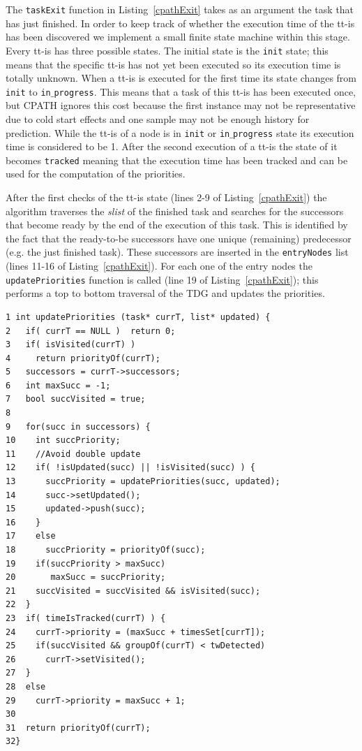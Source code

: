 The \texttt{taskExit} function in Listing~\ref{cpathExit} takes as an argument the task that has just finished. 
In order to keep track of whether the execution time of the tt-is has been discovered we implement a small finite state machine within this stage.
Every tt-is has three possible states. 
The initial state is the \texttt{init} state; this means that the specific tt-is has not yet been executed so its execution time is totally unknown.
When a tt-is is executed for the first time its state changes from \texttt{init} to 
\texttt{in$\_$progress}. 
This means that a task of this tt-is has been executed once, but CPATH ignores this cost because the first instance may not be representative due to cold start effects and one sample may not be enough history for prediction.
While the tt-is of a node is in \texttt{init} or \texttt{in$\_$progress} state its execution time is considered to be 1.
After the second execution of a tt-is the state of it becomes \texttt{tracked} meaning that the execution time has been tracked and can be used for the computation of the priorities.

After the first checks of the tt-is state (lines 2-9 of Listing~\ref{cpathExit}) the algorithm traverses the \textit{slist} of the finished task and searches for the successors that become ready by the end of the execution of this task.
This is identified by the fact that the ready-to-be successors have one unique (remaining) predecessor (e.g. the just finished task).
These successors are inserted in the \texttt{entryNodes} list (lines 11-16 of Listing~\ref{cpathExit}).
For each one of the entry nodes the \texttt{updatePriorities} function is called (line 19 of Listing~\ref{cpathExit}); this performs a top to bottom traversal of the TDG and updates the priorities.

\begin{lstlisting}[float, emph={for,in,void,if,return,non_critical_queue, critical_queue,submit_task}, captionpos=b, caption={Pseudo-code for task prioritization with CPATH},label=cpathUpdate, emph={[2]mat}, emphstyle={[2]}, aboveskip={0\baselineskip}, frame=tb, belowskip={-0.5cm}]
1 int updatePriorities (task* currT, list* updated) {
2   if( currT == NULL )  return 0;
3   if( isVisited(currT) )  
4     return priorityOf(currT);
5   successors = currT->successors;
6   int maxSucc = -1;
7   bool succVisited = true;
8  
9   for(succ in successors) {
10    int succPriority;
11    //Avoid double update
12    if( !isUpdated(succ) || !isVisited(succ) ) {
13      succPriority = updatePriorities(succ, updated);
14      succ->setUpdated();
15      updated->push(succ);
16    }
17    else 
18      succPriority = priorityOf(succ);
19    if(succPriority > maxSucc)
20       maxSucc = succPriority;
21    succVisited = succVisited && isVisited(succ);   
22  }
23  if( timeIsTracked(currT) ) {
24    currT->priority = (maxSucc + timesSet[currT]);
25    if(succVisited && groupOf(currT) < twDetected) 
26      currT->setVisited();
27  }  
28  else
29    currT->priority = maxSucc + 1;
30    
31  return priorityOf(currT);  
32}
\end{lstlisting}

